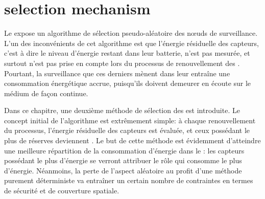 \section{\cns selection mechanism}
\label{se:sec:proposal}

Le  expose un algorithme de sélection pseudo-aléatoire des nœuds de surveillance.
L'un des inconvénients de cet algorithme est que l'énergie résiduelle des capteurs, c'est à dire le niveau d'énergie restant dans leur batterie, n'est pas mesurée, et surtout n'est pas prise en compte lors du processus de renouvellement des \cns.
Pourtant, la surveillance que ces derniers mènent dans leur \cluster entraîne une consommation énergétique accrue, puisqu'ils doivent demeurer en écoute sur le médium de façon continue.

Dans ce chapitre, une deuxième méthode de sélection des \cns est introduite.
Le concept initial de l'algorithme est extrêmement simple: à chaque renouvellement du processus, l'énergie résiduelle des capteurs est évaluée, et ceux possédant le plus de réserves deviennent \cns.
Le but de cette méthode est évidemment d'atteindre une meilleure répartition de la consommation d'énergie dans le \cluster: les capteurs possédant le plus d'énergie se verront attribuer le rôle qui consomme le plus d'énergie.
Néanmoins, la perte de l'aspect aléatoire au profit d'une méthode purement déterministe va entraîner un certain nombre de contraintes en termes de sécurité et de couverture spatiale.



